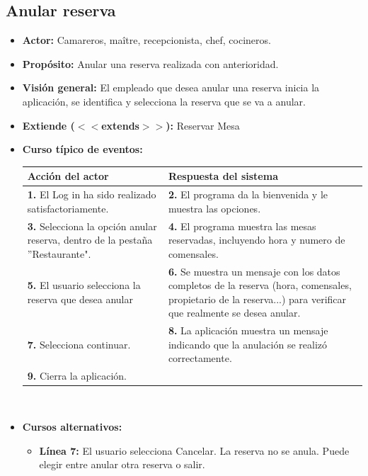 \documentclass[spanish,a4paper,12pt]{report}	%
\begin{document}

		\subsection{Anular reserva}
			\begin{itemize}
			\item \textbf{Actor:} Camareros, maître, recepcionista, chef, cocineros.
			\item \textbf{Propósito: } Anular una reserva realizada con anterioridad.
			\item \textbf{Visión general:} El empleado que desea anular una reserva inicia la aplicación, se identifica y selecciona la reserva que se va a anular.
			\item \textbf{Extiende ($<<$extends$>>$):} Reservar Mesa
			\item \textbf{Curso típico de eventos:} 	\\
				\begin{tabular}{|p{6cm}||p{6cm}|}
				\hline
				\textbf{Acción del actor} & \textbf{Respuesta del sistema} \\ \hline \hline
				\textbf{1.}  El Log in ha sido realizado satisfactoriamente. & \textbf{2.} El programa da la bienvenida y le muestra las opciones. \\ \hline
				\textbf{3.} Selecciona la opción anular reserva, dentro de la pestaña ''Restaurante". & \textbf{4.} El programa muestra las mesas reservadas, incluyendo hora y numero de comensales. \\ \hline
				\textbf{5.} El usuario selecciona la reserva que desea anular	& \textbf{6.} Se muestra un mensaje con los datos completos de la reserva (hora, comensales, propietario de la reserva...) para verificar que realmente se desea anular. \\ \hline
				\textbf{7.} Selecciona continuar.	& \textbf{8.} La aplicación muestra un mensaje indicando que la anulación se realizó correctamente. \\ \hline
				\textbf{9.} Cierra la aplicación. & \textbf{} \\ \hline
			\end{tabular}
			\\
			\item \textbf{Cursos alternativos:} 
			\begin{itemize}
			\item  \textbf{Línea 7:} El usuario selecciona Cancelar. La reserva no se anula. Puede elegir entre anular otra reserva o salir.
			\end {itemize}
		\end {itemize}
	
\end{document}
